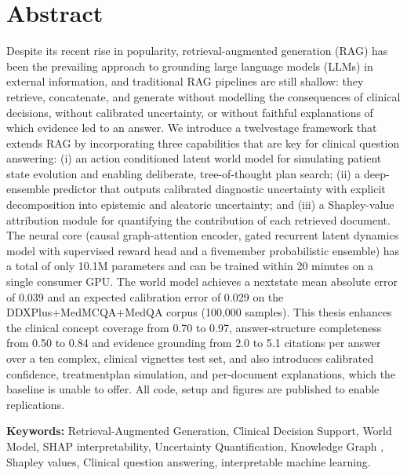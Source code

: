 \section*{Abstract}
Despite its recent rise in popularity, retrieval-augmented generation (RAG) has been the prevailing approach to grounding large language models (LLMs) in external information, and traditional RAG pipelines are still shallow: they retrieve, concatenate, and generate without modelling the consequences of clinical decisions, without calibrated uncertainty, or without faithful explanations of which evidence led to an answer. We introduce a twelvestage framework that extends RAG by incorporating three capabilities that are key for clinical question answering: (i) an action conditioned latent world model for simulating patient state evolution and enabling deliberate, tree-of-thought plan search; (ii) a deep-ensemble predictor that outputs calibrated diagnostic uncertainty with explicit decomposition into epistemic and aleatoric uncertainty; and (iii) a Shapley-value attribution module for quantifying the contribution of each retrieved document. The neural core (causal graph-attention encoder, gated recurrent latent dynamics model with supervised reward head and a fivemember probabilistic ensemble) has a total of only 10.1M parameters and can be trained within 20 minutes on a single consumer GPU. The world model achieves a nextstate mean absolute error of 0.039 and an expected calibration error of 0.029 on the DDXPlus+MedMCQA+MedQA corpus (100,000 samples). This thesis enhances the clinical concept coverage from 0.70 to 0.97, answer-structure completeness from 0.50 to 0.84 and evidence grounding from 2.0 to 5.1 citations per answer over a ten complex, clinical vignettes test set, and also introduces calibrated confidence, treatmentplan simulation, and per-document explanations, which the baseline is unable to offer. All code, setup and figures are published to enable replications.



\vspace{1cm}
\textbf{Keywords:}  Retrieval-Augmented Generation, Clinical Decision Support, World Model, SHAP interpretability, Uncertainty Quantification, Knowledge Graph ,  Shapley values, Clinical question answering, interpretable machine learning.
\pagebreak
